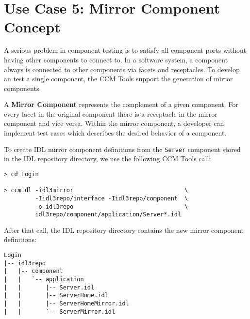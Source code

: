 \section{Use Case 5: Mirror Component Concept}
\label{section:MirrorComponentConcept}

A serious problem in component testing is to satisfy all component ports without
having other components to connect to.
In a software system, a component always is connected to other components via
facets and receptacles.
To develop an test a single component, the CCM Tools support the generation of 
mirror components. 

\vspace{3mm}
A {\bf Mirror Component} represents the complement of a given component. For every
facet in the original component there is a receptacle in the mirror component
and vice versa.
Within the mirror component, a developer can implement test cases which
describes the desired behavior of a component.

\vspace{3mm}
To create IDL mirror component definitions from the {\tt Server} component stored
in the IDL repository directory, we use the following CCM Tools call: 
\begin{footnotesize}
\begin{verbatim}
> cd Login

> ccmidl -idl3mirror                                \
         -Iidl3repo/interface -Iidl3repo/component  \
         -o idl3repo                                \
         idl3repo/component/application/Server*.idl
\end{verbatim}
\end{footnotesize}

After that call, the IDL repository directory contains the new mirror component
definitions: 
 
\begin{footnotesize}
\begin{verbatim}
Login
|-- idl3repo
|   |-- component
|   |   `-- application
|   |       |-- Server.idl
|   |       |-- ServerHome.idl
|   |       |-- ServerHomeMirror.idl
|   |       `-- ServerMirror.idl
\end{verbatim}
\end{footnotesize}

